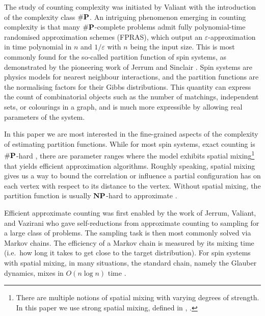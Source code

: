 \documentclass[10pt,a4paper]{article}
\newcommand{\eps}{\varepsilon}
\newcommand{\numP}{\#{\textnormal{\textbf{P}}}}
\newcommand{\NP}{\textnormal{\textbf{NP}}}
\begin{document}
The study of counting complexity was initiated by Valiant \cite{Val79} with the introduction of the complexity class $\numP$.
An intriguing phenomenon emerging in counting complexity is that many $\numP$-complete problems admit fully polynomial-time randomised approximation schemes (FPRAS),
which output an $\eps$-approximation in time polynomial in $n$ and $1/\eps$ with $n$ being the input size.
This is most commonly found for the so-called partition function of spin systems, as demonstrated by the pioneering work of Jerrum and Sinclair \cite{JS89,JS93}.
Spin systems are physics models for nearest neighbour interactions, and the partition functions are the normalising factors for their Gibbs distributions.
This quantity can express the count of combinatorial objects such as the number of matchings, independent sets, or colourings in a graph,
and is much more expressible by allowing real parameters of the system.

In this paper we are most interested in the fine-grained aspects of the complexity of estimating partition functions.
While for most spin systems, exact counting is $\numP$-hard \cite{CC17},
there are parameter ranges where the model exhibits spatial mixing\footnote{There are multiple notions of spatial mixing with varying degrees of strength. In this paper we use strong spatial mixing, defined in , . } that yields efficient approximation algorithms. 
Roughly speaking, spatial mixing gives us a way to bound the correlation or influence a partial configuration has on each vertex with respect to its distance to the vertex. 
Without spatial mixing, the partition function is usually $\NP$-hard to approximate \cite{SS14,GSV16,GSV15}.

Efficient approximate counting was first enabled by the work of Jerrum, Valiant, and Vazirani \cite{JVV86} 
who gave self-reductions from approximate counting to sampling for a large class of problems.
The sampling task is then most commonly solved via Markov chains.
The efficiency of a Markov chain is measured by its mixing time (i.e.~how long it takes to get close to the target distribution).
For spin systems with spatial mixing, in many situations, the standard chain, namely the Glauber dynamics, mixes in $O(n\log n)$ time \cite{CLV21,AJKPV22,CFYZ22,CE22}.
\end{document}
